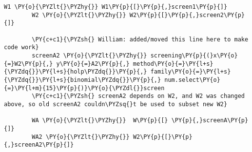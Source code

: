 \begin{Verbatim}[commandchars=\\\{\}]
        W1 \PY{o}{\PYZlt{}\PYZhy{}} W1\PY{p}{[}\PY{p}{,}screen1\PY{p}{]}
        W2 \PY{o}{\PYZlt{}\PYZhy{}} W2\PY{p}{[}\PY{p}{,}screen2\PY{p}{]}
        
        \PY{c+c1}{\PYZsh{} William: added/moved this line here to make code work}
        screenA2 \PY{o}{\PYZlt{}\PYZhy{}} screening\PY{p}{(}x\PY{o}{=}W2\PY{p}{,} y\PY{o}{=}A2\PY{p}{,} method\PY{o}{=}\PY{l+s}{\PYZdq{}}\PY{l+s}{holp\PYZdq{}}\PY{p}{,} family\PY{o}{=}\PY{l+s}{\PYZdq{}}\PY{l+s}{binomial\PYZdq{}}\PY{p}{,} num.select\PY{o}{=}\PY{l+m}{15}\PY{p}{)}\PY{o}{\PYZdl{}}screen 
        \PY{c+c1}{\PYZsh{} screenA2 depends on W2, and W2 was changed above, so old screenA2 couldn\PYZsq{}t be used to subset new W2}
        
        WA \PY{o}{\PYZlt{}\PYZhy{}}  W\PY{p}{[} \PY{p}{,}screenA\PY{p}{]}
        WA2 \PY{o}{\PYZlt{}\PYZhy{}} W2\PY{p}{[}\PY{p}{,}screenA2\PY{p}{]}
\end{Verbatim}

